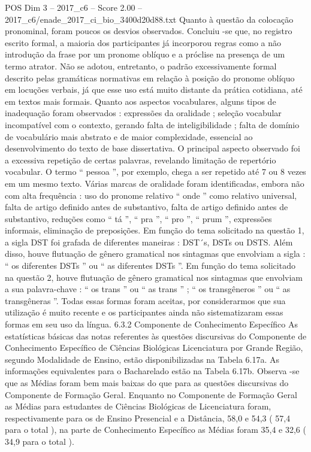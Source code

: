 \begin{textsample}{POS Dim 3 – 2017\_c6 – Score 2.00 – 2017\_c6/enade\_2017\_ci\_bio\_3400d20d88.txt}
Quanto à questão da colocação pronominal, foram poucos os desvios observados.
Concluiu -se que, no registro escrito formal, a maioria dos participantes já incorporou regras como a não introdução da frase por um pronome oblíquo e a próclise na presença de um termo atrator.
Não se adotou, entretanto, o padrão excessivamente formal descrito pelas gramáticas normativas em relação à posição do pronome oblíquo em locuções verbais, já que esse uso está muito distante da prática cotidiana, até em textos mais formais.
Quanto aos aspectos vocabulares, alguns tipos de inadequação foram observados : expressões da oralidade ; seleção vocabular incompatível com o contexto, gerando falta de inteligibilidade ; falta de domínio de vocabulário mais abstrato e de maior complexidade, essencial ao desenvolvimento do texto de base dissertativa.
O principal aspecto observado foi a excessiva repetição de certas palavras, revelando limitação de repertório vocabular.
O termo “ pessoa ”, por exemplo, chega a ser repetido até 7 ou 8 vezes em um mesmo texto.
Várias marcas de oralidade foram identificadas, embora não com alta frequência : uso do pronome relativo “ onde ” como relativo universal, falta de artigo definido antes de substantivo, falta de artigo definido antes de substantivo, reduções como “ tá ”, “ pra ”, “ pro ”, “ prum ”, expressões informais, eliminação de preposições.
Em função do tema solicitado na questão 1, a sigla DST foi grafada de diferentes maneiras : DST´s, DSTs ou DSTS.
Além disso, houve flutuação de gênero gramatical nos sintagmas que envolviam a sigla : “ os diferentes DSTs ” ou “ as diferentes DSTs ”.
Em função do tema solicitado na questão 2, houve flutuação de gênero gramatical nos sintagmas que envolviam a sua palavra-chave : “ os trans ” ou “ as trans ” ; “ os transgêneros ” ou “ as transgêneras ”.
Todas essas formas foram aceitas, por considerarmos que sua utilização é muito recente e os participantes ainda não sistematizaram essas formas em seu uso da língua. 6.3.2 Componente de Conhecimento Específico As estatísticas básicas das notas referentes às questões discursivas do Componente de Conhecimento Específico de Ciências Biológicas Licenciatura por Grande Região, segundo Modalidade de Ensino, estão disponibilizadas na Tabela 6.17a.
As informações equivalentes para o Bacharelado estão na Tabela 6.17b.
Observa -se que as Médias foram bem mais baixas do que para as questões discursivas do Componente de Formação Geral.
Enquanto no Componente de Formação Geral as Médias para estudantes de Ciências Biológicas de Licenciatura foram, respectivamente para os de Ensino Presencial e a Distância, 58,0 e 54,3 ( 57,4 para o total ), na parte de Conhecimento Específico as Médias foram 35,4 e 32,6 ( 34,9 para o total ).

\end{textsample}
